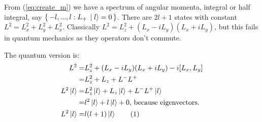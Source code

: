 \documentclass[]{article}
\newcommand\numberthis{\addtocounter{equation}{1}\tag{\theequation}}
\begin{document}
From (\ref{eq:create_m}) we have a spectrum of angular momenta, integral or half integral, say $\set{-l,...,l:L_+\ket{l}=0}$. There are $2l+1$ states with constant $L^2 = L_x^2 + L_y^2 + L_x^2$. Classically $L^2 = L_z^2 +(L_x-iL_y)(L_x+iL_y)$, but this fails in quantum mechanics as they operators don't commute.

The quantum version is:
\begin{align*}
	L^2 =& L_z^2 +(L_x-iL_y)(L_x+iL_y) -i [L_x,L_y]\\
	=& L_z^2 + L_z + L^-L^+\\
	L^2\ket{l}=& L_z^2\ket{l} + L_z\ket{l} + L^-L^+\ket{l}\\
	=& l^2\ket{l} + l\ket{l} + 0\text{, because eigenvectors.}\\
	L^2\ket{l}=&l (l+1) \ket{l} \numberthis \label{eq:max:L}
\end{align*}
\end{document}
